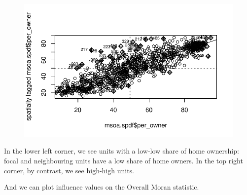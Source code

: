 \documentclass[
  letterpaper,
]{scrbook}
\begin{document}
\begin{figure}[H]

{\centering \includegraphics{04_dependence_files/figure-pdf/unnamed-chunk-13-1.pdf}

}

\end{figure}

In the lower left corner, we see units with a low-low share of home
ownership: focal and neighbouring units have a low share of home owners.
In the top right corner, by contrast, we see high-high units.

And we can plot influence values on the Overall Moran statistic.
\end{document}

